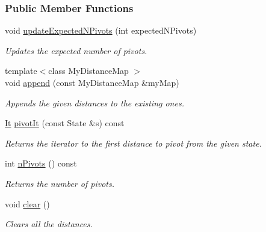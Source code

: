 \subsubsection*{Public Member Functions}
\begin{DoxyCompactItemize}
\item 
void \hyperlink{structslb_1_1ext_1_1heuristic_1_1differential_1_1DistancesToPivots_a8cf1541be1ef95ec622c2eb4521b3839}{update\+Expected\+N\+Pivots} (int expected\+N\+Pivots)\hypertarget{structslb_1_1ext_1_1heuristic_1_1differential_1_1DistancesToPivots_a8cf1541be1ef95ec622c2eb4521b3839}{}\label{structslb_1_1ext_1_1heuristic_1_1differential_1_1DistancesToPivots_a8cf1541be1ef95ec622c2eb4521b3839}

\begin{DoxyCompactList}\small\item\em Updates the expected number of pivots. \end{DoxyCompactList}\item 
{\footnotesize template$<$class My\+Distance\+Map $>$ }\\void \hyperlink{structslb_1_1ext_1_1heuristic_1_1differential_1_1DistancesToPivots_af7dfc673a6ee47fde2300816ed97c3f3}{append} (const My\+Distance\+Map \&my\+Map)
\begin{DoxyCompactList}\small\item\em Appends the given distances to the existing ones. \end{DoxyCompactList}\item 
\hyperlink{structslb_1_1ext_1_1heuristic_1_1differential_1_1DistancesToPivots_aa307465e8919ae3f3e93f5aa1f6e4b6f}{It} \hyperlink{structslb_1_1ext_1_1heuristic_1_1differential_1_1DistancesToPivots_ac995c37475f0e2ec6444d0f5d7d56dd9}{pivot\+It} (const State \&s) const 
\begin{DoxyCompactList}\small\item\em Returns the iterator to the first distance to pivot from the given state. \end{DoxyCompactList}\item 
int \hyperlink{structslb_1_1ext_1_1heuristic_1_1differential_1_1DistancesToPivots_ae477ef19891e31a53fcf000351f7ad66}{n\+Pivots} () const 
\begin{DoxyCompactList}\small\item\em Returns the number of pivots. \end{DoxyCompactList}\item 
void \hyperlink{structslb_1_1ext_1_1heuristic_1_1differential_1_1DistancesToPivots_a7eda75981b7771532823eb013d9b240e}{clear} ()\hypertarget{structslb_1_1ext_1_1heuristic_1_1differential_1_1DistancesToPivots_a7eda75981b7771532823eb013d9b240e}{}\label{structslb_1_1ext_1_1heuristic_1_1differential_1_1DistancesToPivots_a7eda75981b7771532823eb013d9b240e}

\begin{DoxyCompactList}\small\item\em Clears all the distances. \end{DoxyCompactList}\end{DoxyCompactItemize}
